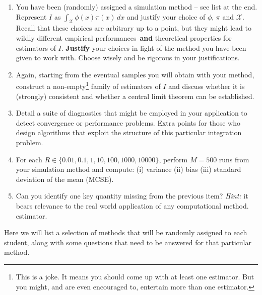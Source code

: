 \documentclass[a4paper,10pt, notitlepage]{report}
\begin{document}
\begin{enumerate}
 \item You have been (randomly) assigned a simulation method -- see list at the end.
 Represent $I$ as $\int_{\mathcal{X}} \phi(x)\pi(x)\,dx$ and justify your choice of $\phi$, $\pi$ and $\mathcal{X}$.
 Recall that these choices are arbitrary up to a point, but they might lead to wildly different empirical performances~\textbf{and} theoretical properties for estimators of $I$.
 \textbf{Justify} your choices in light of the method you have been given to work with.
 Choose wisely and be rigorous in your justifications.
 \item Again, starting from the eventual samples you will obtain with your method, construct a non-empty\footnote{This is a joke.
 It means you should come up with at least one estimator. But you might, and are even encouraged to, entertain more than one estimator.} family of estimators of $I$ and discuss whether it is (strongly) consistent and whether a central limit theorem can be established.
 \item Detail a suite of diagnostics that might be employed in your application to detect convergence or performance problems.
 Extra points for those who design algorithms that exploit the structure of this particular integration problem. 
 \item For each $R \in \{0.01, 0.1, 1, 10, 100, 1000, 10000\}$, perform $M=500$ runs from your simulation method and compute: (i) variance (ii) bias (iii) standard deviation of the mean (MCSE).
 \item Can you identify one key quantity missing from the previous item?
 \textit{Hint:} it bears relevance to the real world application of any computational method.
estimator.\end{enumerate}

Here we will list a selection of methods that will be randomly assigned to each student, along with some questions that need to be answered for that particular method.
\end{document}
